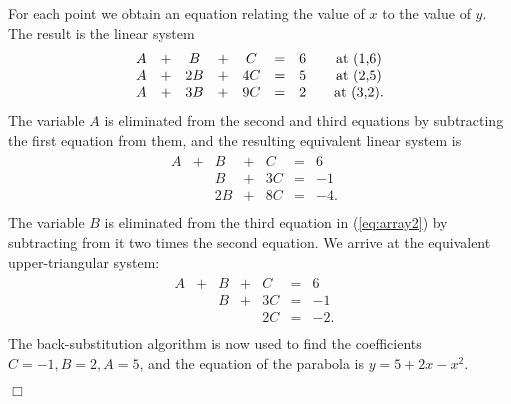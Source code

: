 \documentclass[UTF8,12pt,hyperref]{ctexart}
\newenvironment{solve}[1][\color{blue}\bf Solve]{\begin{trivlist}
\item[\hskip \labelsep {\color{blue}\bfseries
#1}]}{\hfill$\Box$\end{trivlist}}
\begin{document}
 \begin{solve}
  For each point we obtain an equation relating the value of $x$ to the value of $y$.
  The result is the linear system
  \begin{equation}
    \begin{aligned}
      \begin{array}{ccccccccr}
        A  & + & B & + & C & = & 6 & \text{\quad at (1,6)}\\
        A  & + & 2B & + & 4C & = & 5 & \text{\quad at (2,5)}\\
        A  & + & 3B & + & 9C & = & 2 &  \text{\quad at (3,2)}. \\
        \end{array}
    \end{aligned}
  \end{equation}
The variable $A$ is eliminated from the second and third equations by
subtracting the first equation from them, and the resulting equivalent linear system is
\begin{equation}
  \begin{aligned}
    \begin{array}{ccccccccr}
      A  & + & B & + & C & = & 6 & \\
        &  & B & + & 3C & = & -1 & \\
        &  & 2B & + & 8C & = & -4. & \\
      \end{array}
  \end{aligned}
  \label{eq:array2}
\end{equation}
The variable $B$ is eliminated from the third equation in (\ref{eq:array2}) by subtracting
from it two times the second equation. We arrive at the equivalent
upper-triangular system:
\begin{equation}
  \begin{aligned}
    \begin{array}{ccccccccr}
      A  & + & B & + & C & = & 6 & \\
        &  & B & + & 3C & = & -1 & \\
        &  &  &  & 2C & = & -2. & \\
      \end{array}
  \end{aligned}
  \label{eq:array3}
\end{equation}
The back-substitution algorithm is now used to find the coefficients
$C=-1,B=2,A=5$, and the
equation of the parabola is $y=5+2x-x^2$.


\end{solve}
% 
  
\end{document}
